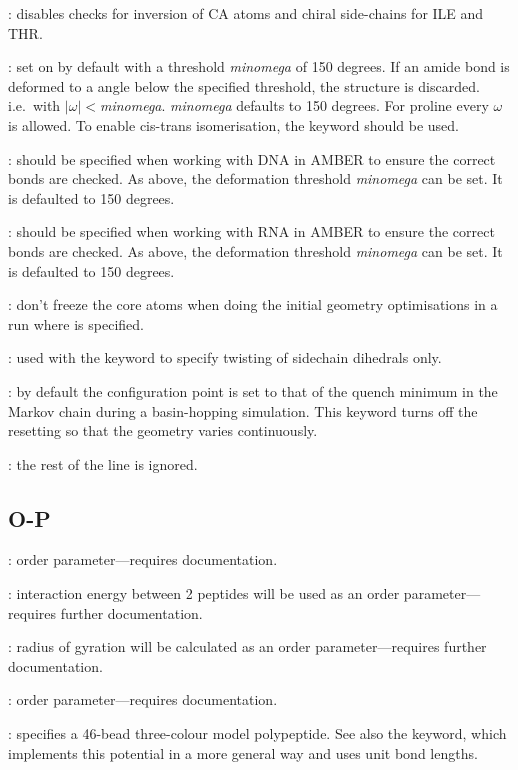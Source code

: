 : disables checks for inversion of CA atoms and chiral side-chains for ILE and THR.

: set on by default with a threshold {\it minomega} of 150 degrees.  
If an amide bond is deformed to a angle below the specified threshold, the structure is discarded. 
i.e.~with $|\omega|<${\it minomega}. {\it minomega\/} defaults to 150 degrees. 
For proline every $\omega$ is allowed. To enable cis-trans isomerisation, the {} keyword should be used. 

: should be specified when working with DNA in AMBER to ensure the correct bonds are 
checked. As above, the deformation threshold {\it minomega} can be set. It is defaulted to 150 degrees.

: should be specified when working with RNA in AMBER to ensure the correct bonds are 
checked. As above, the deformation threshold {\it minomega} can be set. It is defaulted to 150 degrees.

: don't freeze the core atoms when doing the initial geometry optimisations in 
a run where {\/} is specified.

: used with the {} keyword to specify twisting of 
sidechain dihedrals only.

: by default the configuration point is set to that of the
quench minimum in the Markov chain during a basin-hopping simulation. This
keyword turns off the resetting so that the geometry varies continuously.

: the rest of the line is ignored.

\subsection{O-P}
: order parameter---requires documentation.

: interaction energy between 2 peptides will be used as an order parameter---requires 
further documentation.

: radius of gyration will be calculated as an order parameter---requires 
further documentation.

: order parameter---requires documentation.

: specifies a 46-bead three-colour model polypeptide.
See also the {} keyword, which implements this potential in a more
general way and uses unit bond lengths.

